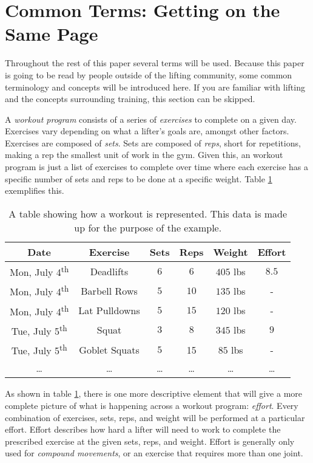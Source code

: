 \section{Common Terms: Getting on the Same Page}
\label{sec:CommonTermsSection}

Throughout the rest of this paper several terms will be used. Because this paper is going to be read by people outside of the lifting community, some common terminology and concepts will be introduced here. If you are familiar with lifting and the concepts surrounding training, this section can be skipped.

A \textit{workout program} consists of a series of \textit{exercises} to complete on a given day. Exercises vary depending on what a lifter's goals are, amongst other factors. Exercises are composed of \textit{sets}. Sets are composed of \textit{reps}, short for repetitions, making a rep the smallest unit of work in the gym. Given this, an workout program is just a list of exercises to complete over time where each exercise has a specific number of sets and reps to be done at a specific weight. Table \ref{tab:WorkoutProgramExample} exemplifies this.

\begin{table}[h]
    \centering
    \begin{tabular}{c|c|c|c|c|c}
        Date & Exercise & Sets & Reps & Weight & Effort \\
        \hline
        Mon, July 4\textsuperscript{th} & Deadlifts & $6$ & $6$ & $405$ lbs & $8.5$ \\
        Mon, July 4\textsuperscript{th} & Barbell Rows & $5$ & $10$ & $135$ lbs & - \\
        Mon, July 4\textsuperscript{th} & Lat Pulldowns & $5$ & $15$ & $120$ lbs & - \\
        Tue, July 5\textsuperscript{th} & Squat & $3$ & $8$ & $345$ lbs & $9$ \\
        Tue, July 5\textsuperscript{th} & Goblet Squats & $5$ & 15 & $85$ lbs & - \\
        \dots & \dots & \dots & \dots & \dots & \dots \\
    \end{tabular}
    \caption{A table showing how a workout is represented. This data is made up for the purpose of the example.}
    \label{tab:WorkoutProgramExample}
\end{table}

As shown in table \ref{tab:WorkoutProgramExample}, there is one more descriptive element that will give a more complete picture of what is happening across a workout program: \textit{effort}. Every combination of exercises, sets, reps, and weight will be performed at a particular effort. Effort describes how hard a lifter will need to work to complete the prescribed exercise at the given sets, reps, and weight. Effort is generally only used for \textit{compound movements}, or an exercise that requires more than one joint.


